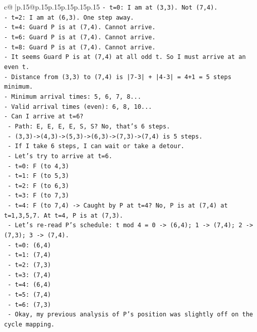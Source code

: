 \documentclass{article}
\begin{document}
{\begin{supertabular}{c@{$\;$}|p{.15\linewidth}@{}p{.15\linewidth}p{.15\linewidth}p{.15\linewidth}p{.15\linewidth}p{.15\linewidth}}
{{{\texttt{{-} t=0: I am at (3,3). Not (7,4).} \\
\texttt{{-} t=2: I am at (6,3). One step away.} \\
\texttt{{-} t=4: Guard P is at (7,4). Cannot arrive.} \\
\texttt{{-} t=6: Guard P is at (7,4). Cannot arrive.} \\
\texttt{{-} t=8: Guard P is at (7,4). Cannot arrive.} \\
\texttt{{-} It seems Guard P is at (7,4) at all odd t. So I must arrive at an even t.} \\
\texttt{{-} Distance from (3,3) to (7,4) is |7{-}3| + |4{-}3| = 4+1 = 5 steps minimum.} \\
\texttt{{-} Minimum arrival times: 5, 6, 7, 8...} \\
\texttt{{-} Valid arrival times (even): 6, 8, 10...} \\
\texttt{{-} Can I arrive at t=6?} \\
\texttt{  {-} Path: E, E, E, E, S, S? No, that's 6 steps.} \\
\texttt{  {-} (3,3){-}>(4,3){-}>(5,3){-}>(6,3){-}>(7,3){-}>(7,4) is 5 steps.} \\
\texttt{  {-} If I take 6 steps, I can wait or take a detour.} \\
\texttt{  {-} Let's try to arrive at t=6.} \\
\texttt{  {-} t=0: F (to 4,3)} \\
\texttt{  {-} t=1: F (to 5,3)} \\
\texttt{  {-} t=2: F (to 6,3)} \\
\texttt{  {-} t=3: F (to 7,3)} \\
\texttt{  {-} t=4: F (to 7,4) {-}> Caught by P at t=4? No, P is at (7,4) at t=1,3,5,7. At t=4, P is at (7,3).} \\
\texttt{    {-} Let's re{-}read P's schedule: t mod 4 = 0 {-}> (6,4); 1 {-}> (7,4); 2 {-}> (7,3); 3 {-}> (7,4).} \\
\texttt{    {-} t=0: (6,4)} \\
\texttt{    {-} t=1: (7,4)} \\
\texttt{    {-} t=2: (7,3)} \\
\texttt{    {-} t=3: (7,4)} \\
\texttt{    {-} t=4: (6,4)} \\
\texttt{    {-} t=5: (7,4)} \\
\texttt{    {-} t=6: (7,3)} \\
\texttt{  {-} Okay, my previous analysis of P's position was slightly off on the cycle mapping.} \\
}}}
\end{supertabular}}
\end{document}
